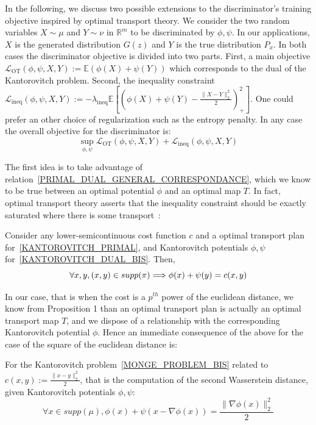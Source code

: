 \documentclass[runningheads]{llncs}
\begin{document}
In the following, we discuss two possible extensions to the discriminator's training objective inspired by optimal transport theory. We consider the two random variables $X\sim \mu$ and $Y\sim \nu$ in $\mathds{R}^m$ to be discriminated by $\phi,\psi$. In our applications, $X$ is the generated distribution $G(z)$ and $Y$ is the true distribution $P_x$. In both cases the discriminator objective is divided into two parts. First, a main objective $\mathcal{L}_{\text{OT}}(\phi,\psi,X,Y):=\mathds{E}(\phi(X)+\psi(Y))$ which corresponds to the dual of the Kantorovitch problem. Second, the inequality constraint $\mathcal{L}_{\text{ineq}}(\phi,\psi,X,Y):=-\lambda_{\text{ineq}} \mathds{E} [(\phi(X)+\psi(Y)-\frac{\|X-Y\|_2^2}{2})_{+}^2 ]$. One could prefer an other choice of regularization such as the entropy penalty. In any case the overall objective for the discriminator is:
\begin{equation*}
    \sup_{\phi,\psi} \mathcal{L}_{\text{OT}}(\phi,\psi,X,Y) + \mathcal{L}_{\text{ineq}}(\phi,\psi,X,Y)
\end{equation*}

The first idea is to take advantage of relation~\eqref{PRIMAL_DUAL_GENERAL_CORRESPONDANCE}, which we know to be true between an optimal potential $\phi$ and an optimal map $T$. In fact, optimal transport theory asserts that the inequality constraint should be exactly saturated where there is some transport~\citep{Villani}:
\begin{theorem}
Consider any lower-semicontinuous cost function $c$ and a optimal transport plan for~\eqref{KANTOROVITCH_PRIMAL}, and Kantorovitch potentials $\phi,\psi$ for~\eqref{KANTOROVITCH_DUAL_BIS}. Then,
\begin{equation}
 \forall x,y,  (x,y)\in supp(\pi)  \\ \Longrightarrow  \phi(x) + \psi(y) = c(x,y)
 \label{GENERAL_RELATIONSHIP_PI_COST_EQ}
\end{equation}
\end{theorem}

In our case, that is when the cost is a $p^{th}$ power of the euclidean distance, we know from Proposition 1 than an optimal transport plan is actually an optimal transport map $T$, and we dispose of a relationship with the corresponding Kantorovitch potential $\phi$. Hence an immediate consequence of the above for the case of the square of the euclidean distance is:

\begin{corollary}
For the Kantorovitch problem~\eqref{MONGE_PROBLEM_BIS} related to $c(x,y):=\frac{\|x-y\|_2^2}{2}$, that is the computation of the second Wasserstein distance, given Kantorovitch potentials $\phi,\psi$:
\begin{equation}
 \forall x \in supp(\mu),  \phi(x) + \psi(x-\nabla \phi(x)) =\frac{\|\nabla \phi(x)\|_2^2}{2}
 \label{EQ_COST_PHI_PSI}
\end{equation}
\end{corollary}
\end{document}
